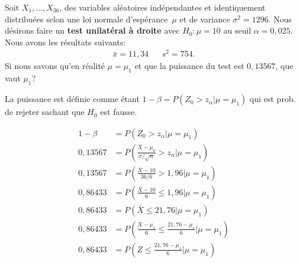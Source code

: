 \begin{questions}



\newpage

\question[9] Soit $X_1,\hdots, X_{36}$, des variables aléatoires indépendantes et identiquement distribuées selon une loi normale d'espérance~$\mu$ et de variance $\sigma^2=1296$.
Nous désirons faire un \textbf{test unilatéral à droite} avec $H_0:\mu=10$ au seuil $\alpha = 0,025$.
Nous avons les résultats suivants:
\begin{align*}
    \bar{x}= 11,34 &  & s^2=754.
\end{align*}
Si nous savons qu'en réalité $\mu=\mu_1$ et que la puissance du test est $0,13567$, que vaut $\mu_1$?


\begin{solution}
    La puissance est définie comme étant $1-\beta=P(Z_0>z_{\alpha}|\mu=\mu_1)$ qui est prob. de rejeter sachant que $H_0$ est fausse.

    \begin{align*}
        1-\beta &= P(Z_0>z_{\alpha}|\mu=\mu_1)\\
        0,13567&= P\left(\frac{\bar{X}-\mu_0}{\sigma/\sqrt{n}}>z_{\alpha}|\mu=\mu_1\right)\\
        0,13567&= P\left(\frac{\bar{X}-10}{36/6}>1,96|\mu=\mu_1\right)\\
        0,86433&= P\left(\frac{\bar{X}-10}{6}\leq1,96|\mu=\mu_1\right)\\
        0,86433&= P\left(\bar{X}\leq21,76|\mu=\mu_1\right)\\
        0,86433&=P\left(\frac{\bar{X}-\mu_1}{6}\leq\frac{21,76-\mu_1}{6}|\mu=\mu_1\right)\\
        0,86433&=P\left(Z\leq\frac{21,76-\mu_1}{6}|\mu=\mu_1\right)\\
    \end{align*}


\end{solution}
\end{questions}
